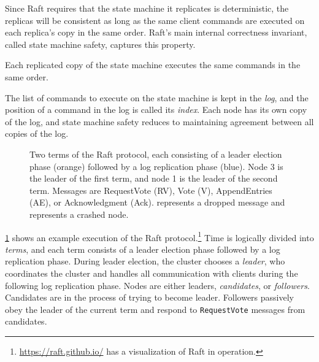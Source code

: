 Since Raft requires that the
state machine it replicates is deterministic,
the replicas will be consistent
as long as the same client commands
are executed on each replica's copy in the same order.
Raft's main internal correctness invariant,
called state machine safety,
captures this property.
\begin{proposition}\label{prop:sms}
  Each replicated copy of the state machine executes the same commands in the same order.
\end{proposition}

The list of commands to execute on the state machine
is kept in the \emph{log},
and the position of a command in the log is called its \emph{index}.
Each node has its own copy of the log,
and state machine safety reduces to maintaining agreement between
all copies of the log.

\begin{figure}
  \centering
  
  \caption[Terms in Raft]{Two terms of the Raft protocol, each consisting of a leader election phase (orange)
    followed by a log replication phase (blue).
    Node 3 is the leader of the first term, and node 1 is the leader of the
    second term.
  Messages are RequestVote (RV),
Vote (V), AppendEntries (AE), or Acknowledgment (Ack).
represents a dropped message and
represents a crashed node.
}
  \label{fig:raft-overview}
\end{figure}

\cref{fig:raft-overview} shows an example execution of the Raft
protocol.\footnote{\url{https://raft.github.io/} has a visualization of Raft in operation.}
Time is logically divided into \emph{terms},
and each term consists of a leader election phase
followed by a log replication phase.
During leader election, the cluster chooses a \emph{leader},
who coordinates the cluster and handles all communication with clients
during the following log replication phase.
Nodes are either leaders, \emph{candidates}, or \emph{followers}.
Candidates are in the process of trying to become leader.
Followers passively obey the leader of the current term and respond to
\texttt{RequestVote} messages from candidates.

